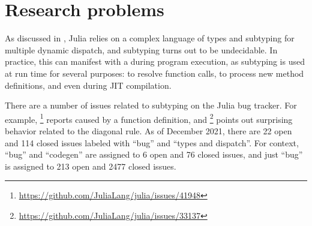 \chapter{Research problems}

As discussed in , Julia relies on a complex language of types
and subtyping for multiple dynamic dispatch, and subtyping turns out to be
undecidable. In practice, this can manifest with a 
during program execution, as subtyping is used at run time for several purposes:
to resolve function calls, to process new method definitions, and even during
JIT compilation.

There are a number of issues related to subtyping on the Julia bug tracker.
For example,
\href{https://github.com/JuliaLang/julia/issues/41948}{}\footnote{
    \url{https://github.com/JuliaLang/julia/issues/41948}
} reports  caused by a function definition,
and
\href{https://github.com/JuliaLang/julia/issues/33137}{}\footnote{
    \url{https://github.com/JuliaLang/julia/issues/33137}
} points out surprising behavior related to the diagonal rule.
As of December 2021, there are 22 open and 114 closed issues labeled with ``bug''
and ``types and dispatch''. For context, ``bug'' and ``codegen'' are assigned to
6 open and 76 closed issues, and just ``bug'' is assigned to 213 open and 2477
closed issues.
